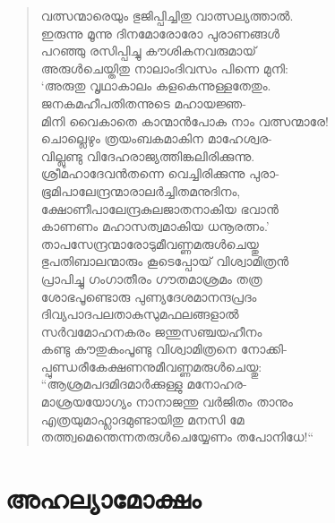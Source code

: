 \begin{verse}
വത്സന്മാരെയും ഭുജിപ്പിച്ചിതു വാത്സല്യത്താല്‍.\\
ഇരുന്നു മൂന്നു ദിനമോരോരോ പുരാണങ്ങള്‍\\
പറഞ്ഞു രസിപ്പിച്ചു കൗശികനവരുമായ്\\
അരുള്‍ചെയ്തിതു നാലാംദിവസം പിന്നെ മുനി:\\
‘അരുതു വൃഥാകാലം കളകെന്നുള്ളതേതും.\\
ജനകമഹീപതിതന്നുടെ മഹായജ്ഞ-\\
മിനി വൈകാതെ കാന്മാന്‍പോക നാം വത്സന്മാരേ!\\
ചൊല്ലെഴും ത്രയംബകമാകിന മാഹേശ്വര-\\
വില്ലുണ്ടു വിദേഹരാജ്യത്തിങ്കലിരിക്കുന്നു.\\
ശ്രീമഹാദേവന്‍തന്നെ വെച്ചിരിക്കുന്നു പുരാ-\\
ഭൂമിപാലേന്ദ്രന്മാരാലര്‍ച്ചിതമനുദിനം,\\
ക്ഷോണീപാലേന്ദ്രകുലജാതനാകിയ ഭവാന്‍\\
കാണണം മഹാസത്വമാകിയ ധനൂരത്നം.’\\
താപസേന്ദ്രന്മാരോടുമീവണ്ണമരുള്‍ചെയ്തു\\
ഭുപതിബാലന്മാരും കൂടെപ്പോയ് വിശ്വാമിത്രന്‍\\
പ്രാപിച്ചു ഗംഗാതീരം ഗൗതമാശ്രമം തത്ര\\
ശോഭപൂണ്ടൊരു പുണ്യദേശമാനന്ദപ്രദം\\
ദിവ്യപാദപലതാകുസുമഫലങ്ങളാല്‍\\
സര്‍വമോഹനകരം ജന്തുസഞ്ചയഹീനം\\
കണ്ടു കൗതുകംപൂണ്ടു വിശ്വാമിത്രനെ നോക്കി-\\
പ്പുണ്ഡരീകേക്ഷണനുമീവണ്ണമരുള്‍ചെയ്തു:\\
“ആശ്രമപദമിദമാര്‍ക്കുള്ളു മനോഹര-\\
മാശ്രയയോഗ്യം നാനാജന്തു വര്‍ജിതം താനും\\
എത്രയുമാഹ്ലാദമുണ്ടായിതു മനസി മേ\\
തത്ത്വമെന്തെന്നതരുള്‍ചെയ്യേണം തപോനിധേ!“
\end{verse}


\section{അഹല്യാമോക്ഷം}

